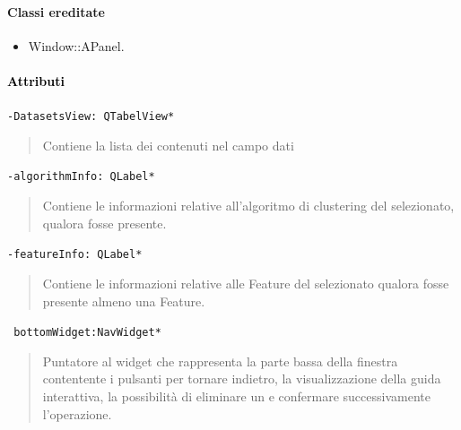 \paragraph{Classi ereditate\\}
\begin{itemize}
\item Window::APanel.
\end{itemize}
\paragraph{\textcolor{black}{Attributi\\}}

\color{teal}\verb!-DatasetsView: QTabelView*!
\color{black}
\begin{quote}
Contiene la lista dei \dataset{} contenuti nel campo dati 
\end{quote}
\color{teal}\verb!-algorithmInfo: QLabel*!
\color{black}
\begin{quote}
Contiene le informazioni relative all'algoritmo di clustering\g{} del \protocol{} selezionato, qualora fosse presente.
\end{quote}
\color{teal}\verb!-featureInfo: QLabel*!
\color{black}
\begin{quote}
Contiene le informazioni relative alle Feature\g{} del \protocol{} selezionato qualora fosse presente almeno una Feature\g{}.
\end{quote}
\color{teal}\verb! bottomWidget:NavWidget*!
\color{black} 
\begin{quote}
Puntatore al widget che rappresenta la parte bassa della finestra contentente i pulsanti per tornare indietro, la visualizzazione della guida interattiva, la possibilità di eliminare un \dataset{} e confermare successivamente l'operazione.
\end{quote}
